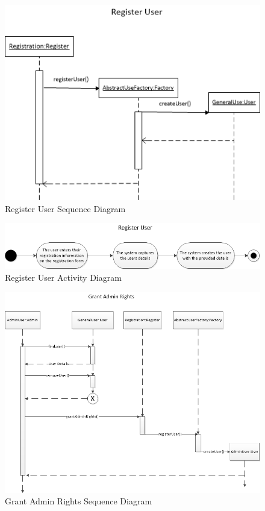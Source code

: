 \documentclass{article}
\begin{document}
	\begin{figure}[h!]
      \includegraphics[width=\textwidth]{Register_User_Sequence_Diagram.png}
      \caption{Register User Sequence Diagram}
    \end{figure}
    
    \clearpage
    
    \begin{figure}[h!]
      \includegraphics[width=\textwidth]{Register_User_Activity_Diagram.png}
      \caption{Register User Activity Diagram}
    \end{figure}
    
    \begin{figure}[h!]
      \includegraphics[width=\textwidth]{Grant_Admin_Rights_Sequence_Diagram.png}
      \caption{Grant Admin Rights Sequence Diagram}
    \end{figure}
    
\end{document}
